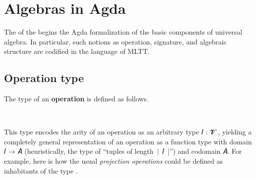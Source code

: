 \documentclass[a4paper,UKenglish,cleveref, autoref, thm-restate]{lipics-v2019}
\begin{document}
\section{Algebras in Agda}\label{sec:algebras-in-agda}
The \basicmodule of the \agdaualib begins the Agda formalization of the basic components of universal algebra. In particular, such notions as operation, signature, and algebraic structure are codified in the language of MLTT.

\subsection{Operation type}
The type of an \textbf{operation} is defined as follows.
\begin{code}%
\>[0]\AgdaSpace{}%
\AgdaSymbol{:}\AgdaSpace{}%
\AgdaSpace{}%
\AgdaSpace{}%
\AgdaSpace{}%
\AgdaSpace{}%
\AgdaSpace{}%
\AgdaSpace{}%
\AgdaSpace{}%
\AgdaSpace{}%
\AgdaSpace{}%
\<%
\\
\>[0]\AgdaSpace{}%
\AgdaSpace{}%
\AgdaSpace{}%
\AgdaSymbol{=}\AgdaSpace{}%
\AgdaSymbol{(}\AgdaSpace{}%
\AgdaSpace{}%
\AgdaSymbol{)}\AgdaSpace{}%
\AgdaSpace{}%
\<%
\end{code}
This type encodes the arity of an operation as an arbitrary type \ab 𝐼 : \ab 𝓥 ̇, yielding a completely general representation of an operation as a function type with domain \ab 𝐼 → \ab 𝐴 (heuristically, the type of ``tuples of length~|~\ab 𝐼~|'') and codomain \ab 𝐴. For example, here is how the usual \emph{projection operations} could be defined as inhabitants of the type
\AgdaSpace{}\AgdaSpace{}.
\begin{code}%
\>[0]\AgdaSpace{}%
\AgdaSymbol{:}\AgdaSpace{}%
\AgdaSymbol{\{}\AgdaSpace{}%
\AgdaSymbol{:}\AgdaSpace{}%
\AgdaSpace{}%
\AgdaSpace{}%
\AgdaSymbol{\}}\AgdaSpace{}%
\AgdaSymbol{\{}\AgdaSpace{}%
\AgdaSymbol{:}\AgdaSpace{}%
\AgdaSpace{}%
\AgdaSpace{}%
\AgdaSymbol{\}}\AgdaSpace{}%
\AgdaSpace{}%
\AgdaSpace{}%
\AgdaSpace{}%
\AgdaSpace{}%
\AgdaSpace{}%
\<%
\\
\>[0]\AgdaSpace{}%
\AgdaSpace{}%
\AgdaSpace{}%
\AgdaSymbol{=}\AgdaSpace{}%
\AgdaSpace{}%
\<%
\end{code}
\end{document}
